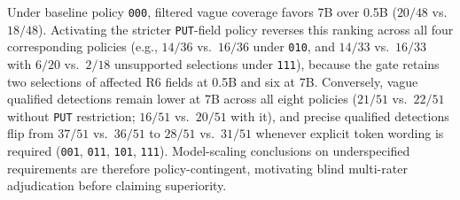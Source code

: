 Under baseline policy \texttt{000}, filtered vague coverage favors 7B over 0.5B ($20/48$ vs.\ $18/48$). Activating the stricter \texttt{PUT}-field policy reverses this ranking across all four corresponding policies (e.g., $14/36$ vs.\ $16/36$ under \texttt{010}, and $14/33$ vs.\ $16/33$ with $6/20$ vs.\ $2/18$ unsupported selections under \texttt{111}), because the gate retains two selections of affected R6 fields at 0.5B and six at 7B. Conversely, vague qualified detections remain lower at 7B across all eight policies ($21/51$ vs.\ $22/51$ without \texttt{PUT} restriction; $16/51$ vs.\ $20/51$ with it), and precise qualified detections flip from $37/51$ vs.\ $36/51$ to $28/51$ vs.\ $31/51$ whenever explicit token wording is required (\texttt{001}, \texttt{011}, \texttt{101}, \texttt{111}). Model-scaling conclusions on underspecified requirements are therefore policy-contingent, motivating blind multi-rater adjudication before claiming superiority.
